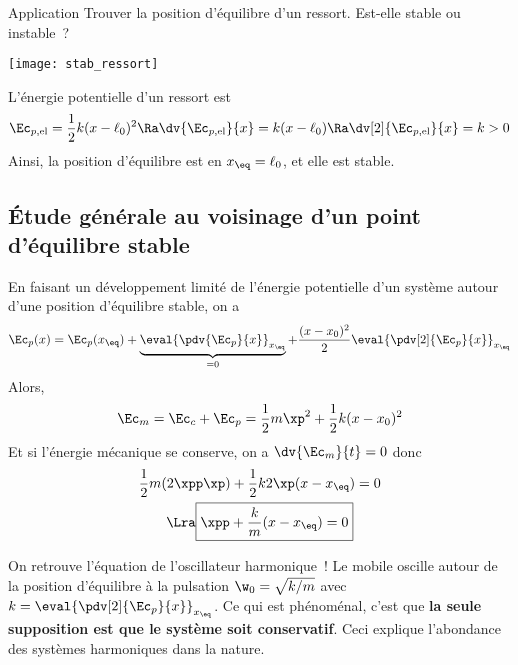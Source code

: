 \documentclass[../main/main.tex]{subfiles}
\begin{document}
\begin{rexem}{Application}
    Trouver la position d'équilibre d'un ressort. Est-elle stable ou instable~?
    \tcblower
    \begin{minipage}{0.25\linewidth}
        \begin{center}
            \texttt{[image: stab\_ressort]}
        \end{center}
    \end{minipage}
    \hfill
    \begin{minipage}{0.70\linewidth}
        L'énergie potentielle d'un ressort est
        \[
            \Ec_{p,\rm el} = \frac{1}{2}k(x-\ell_0)^2
            \Ra
            \dv{\Ec_{p,\rm el}}{x} = k(x-\ell_0)
            \Ra
            \dv[2]{\Ec_{p,\rm el}}{x} = k > 0
        \]
        Ainsi, la position d'équilibre est en $x_{\eq} = \ell_0$, et elle est
        stable.
    \end{minipage}
\end{rexem}

\subsection{Étude générale au voisinage d'un point d'équilibre stable}
En faisant un développement limité de l'énergie potentielle d'un système autour
d'une position d'équilibre stable, on a
\begin{gather*}
    \Ec_p(x) = \Ec_p(x_{\eq}) +
    \underbrace{\eval{\pdv{\Ec_p}{x}}_{x_{\eq}}}_{=0} +
    \frac{(x-x_0)^2}{2}\eval{\pdv[2]{\Ec_p}{x}}_{x_{\eq}}
\end{gather*}
\smallbreak\noindent
Alors,
\[\Ec_m = \Ec_c + \Ec_p = \frac{1}{2}m\xp^2 + \frac{1}{2}k(x-x_0)^2\]
Et si l'énergie mécanique se conserve, on a $\dv{\Ec_m}{t} = 0$ donc
\begin{gather*}
    \frac{1}{2}m(2\xpp\xp) + \frac{1}{2}k 2\xp(x-x_{\eq}) = 0
    \\\Lra
    \boxed{\xpp + \frac{k}{m}(x-x_{\eq}) = 0}
\end{gather*}

On retrouve l'équation de l'oscillateur harmonique~! Le mobile oscille autour de
la position d'équilibre à la pulsation $\w_0 = \sqrt{k/m}$ avec $k =
\eval{\pdv[2]{\Ec_p}{x}}_{x_{\eq}}$. Ce qui est phénoménal, c'est que \textbf{la
seule supposition est que le système soit conservatif}. Ceci explique
l'abondance des systèmes harmoniques dans la nature.
\end{document}
